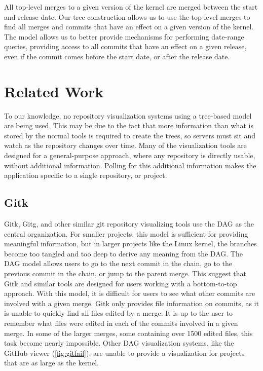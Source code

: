 \documentclass[conference, draftclsnofoot]{IEEEtran}
\begin{document}
All top-level merges to a given version of the kernel are merged between the
start and release date. Our tree construction allows us to use the top-level
merges to find all merges and commits that have an effect on a given version of
the kernel. The model allows us to better provide mechanisms for performing
date-range queries, providing access to all commits that have an effect on a
given release, even if the commit comes before the start date, or after the
release date.

\section{Related Work}

To our knowledge, no repository visualization systems using a tree-based model
are being used. This may be due to the fact that more information than what
is stored by the normal tools is required to create the trees, so servers must
sit and watch as the repository changes over time. Many of the visualization
tools are designed for a general-purpose approach, where any repository is
directly usable, without additional information. Polling for this additional
information makes the application specific to a single repository, or project.

\subsection{Gitk}
Gitk, Gitg, and other similar git repository visualizing tools use the DAG as
the central organization. For smaller projects, this model is sufficient for
providing meaningful information, but in larger projects like the Linux kernel,
the branches become too tangled and too deep to derive any meaning from the
DAG. The DAG model allows users to go to the next commit in the chain, go to
the previous commit in the chain, or jump to the parent merge. This suggest
that Gitk and similar tools are designed for users working with a bottom-to-top
approach. With this model, it is difficult for users to see what other commits
are involved with a given merge. Gitk only provides file information on
commits, as it is unable to quickly find all files edited by a merge. It is up
to the user to remember what files were edited in each of the commits involved
in a given merge. In some of the larger merges, some containing over 1500
edited files, this task become nearly impossible.
Other DAG visualization systems, like the GitHub viewer (\ref{fig:gitfail}),
are unable to provide a visualization for projects that are as large as the
kernel.
\end{document}
